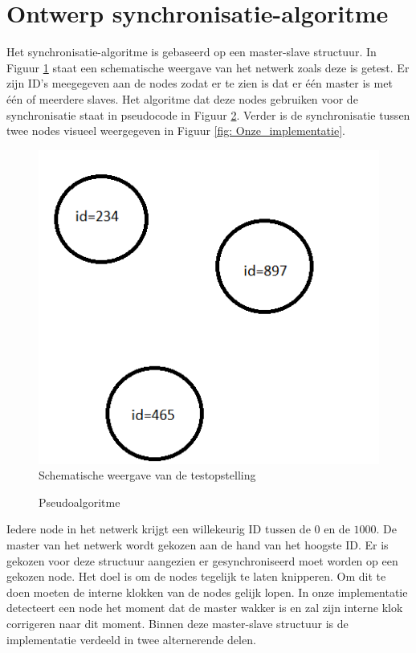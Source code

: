 \documentclass{article}
\begin{document}
\section{Ontwerp synchronisatie-algoritme}
Het synchronisatie-algoritme is gebaseerd op een master-slave structuur. In Figuur \ref{fig: Schematisch} staat een schematische weergave van het netwerk zoals deze is getest. Er zijn ID's meegegeven aan de nodes zodat er te zien is dat er \'{e}\'{e}n master is met \'{e}\'{e}n of meerdere slaves. Het algoritme dat deze nodes gebruiken voor de synchronisatie staat in pseudocode in Figuur \ref{fig: pseudo}. Verder is de synchronisatie tussen twee nodes visueel weergegeven in Figuur \ref{fig: Onze_implementatie}.
\begin{figure}[h]
\centering\includegraphics[scale=0.5]{testopstelling}
\caption{Schematische weergave van de testopstelling}
\label{fig: Schematisch}
\end{figure}
\begin{figure}
\centering
\verbdef{}
\framebox{
 \begin{minipage}{14.5cm}
\centering

 \end{minipage}
}
\caption{Pseudoalgoritme}
\label{fig: pseudo}
\end{figure}
Iedere node in het netwerk krijgt een willekeurig ID tussen de $0$ en de $1000$. De master van het netwerk wordt gekozen aan de hand van het hoogste ID. Er is gekozen voor deze structuur aangezien er gesynchroniseerd moet worden op een gekozen node. Het doel is om de nodes tegelijk te laten knipperen. Om dit te doen moeten de interne klokken van de nodes gelijk lopen. In onze implementatie detecteert een node het moment dat de master wakker is en zal zijn interne klok corrigeren naar dit moment. Binnen deze master-slave structuur is de implementatie verdeeld in twee alternerende delen.\\
\end{document}

